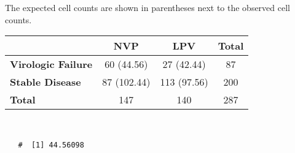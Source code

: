 \documentclass[letterpaper,12pt,twoside,]{pinp}
\begin{document}
\begin{enumerate}
\begin{enumerate}
    The expected cell counts are shown in parentheses next to the
    observed cell counts.

    \begin{center}
      \begin{tabular}{l|cc|c} 
    & \textbf{NVP} & \textbf{LPV} & \textbf{Total}\\ \hline
      \textbf{Virologic Failure} & 60 (44.56) & 27 (42.44) & 87  \\ 
      \textbf{Stable Disease} & 87 (102.44) & 113 (97.56)& 200 \\ \hline
      \textbf{Total} & 147 & 140 & 287  \\ 
      \end{tabular}\\
     \end{center}

    \color{black}
  \end{enumerate}

\begin{Shaded}
\begin{Highlighting}[]

\StringTok{ }
\StringTok{ }
\StringTok{ }
\StringTok{ }
\StringTok{ }

\NormalTok{ =}\StringTok{ }\OperatorTok{*}\StringTok{ }\OperatorTok{/}
\end{Highlighting}
\end{Shaded}

  \begin{ShadedResult}
   \begin{verbatim}
   #  [1] 44.56098
   \end{verbatim}
   \end{ShadedResult}

\begin{Shaded}
\begin{Highlighting}[]
\NormalTok{ =}\StringTok{ }\OperatorTok{*}\StringTok{ }\OperatorTok{/}
\end{Highlighting}
\end{Shaded}


\end{enumerate}
\end{document}
